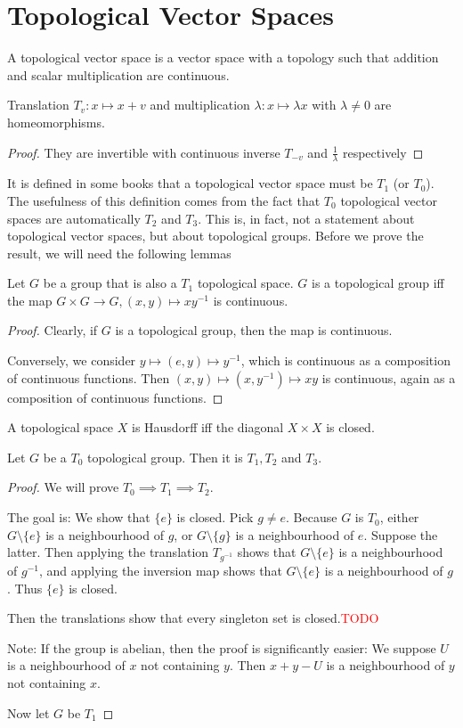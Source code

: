 \documentclass[prb,12pt]{revtex4-2}
\theoremstyle{definition}
\theoremstyle{definition}
\theoremstyle{definition}
\begin{document}
	\section{Topological Vector Spaces}
	\begin{Definition}
		A topological vector space is a vector space with a topology such that addition and scalar multiplication are continuous.
	\end{Definition}
	\begin{Theorem}
		Translation $T_v:x\mapsto x + v$ and multiplication $\lambda: x \mapsto \lambda x$ with $\lambda\neq0$ are homeomorphisms.
	\end{Theorem}
	\begin{proof}
		They are invertible with continuous inverse $T_{-v}$ and $\frac 1\lambda$ respectively
	\end{proof}
	It is defined in some books that a topological vector space must be $T_1$ (or $T_0$). The usefulness of this definition comes from the fact that $T_0$ topological vector spaces are automatically $T_2$ and $T_3$. This is, in fact, not a statement about topological vector spaces, but about topological groups. Before we prove the result, we will need the following lemmas
	\begin{Lemma}
		Let $G$ be a group that is also a $T_1$ topological space. $G$ is a topological group iff the map $G \times G \to G, (x,y)\mapsto xy^{-1}$ is continuous.
	\end{Lemma}
\begin{proof}
	Clearly, if $G$ is a topological group, then the map is continuous. 
	
	Conversely, we consider $y \mapsto (e,y) \mapsto y^{-1}$, which is continuous as a composition of continuous functions. Then $(x,y) \mapsto (x, y^{-1}) \mapsto xy$ is continuous, again as a composition of continuous functions.
\end{proof}
\begin{Lemma}
	A topological space $X$ is Hausdorff iff the diagonal $X\times X$ is closed.
\end{Lemma}
	\begin{Theorem}
		Let $G$ be a $T_0$ topological group. Then it is $T_1, T_2$ and $T_3$.
	\end{Theorem} 
\begin{proof}
	We will prove $T_0\implies T_1\implies T_2$. 
	
	The goal is: We show that $\{e\}$ is closed. Pick $g\neq e$. Because $G$ is $T_0$, either $G \setminus \{e\}$ is a neighbourhood of $g$, or $G \setminus \{g\}$ is a neighbourhood of $e$. Suppose the latter. Then applying the translation $T_{g^{-1}}$ shows that $G \setminus \{e\}$ is a neighbourhood of $g^{-1}$, and applying the inversion map shows that $G \setminus \{e\}$ is a neighbourhood of $g$. Thus $\{e\}$ is closed.
	
	Then the translations show that every singleton set is closed.\textcolor{red}{TODO}
	
	Note: If the group is abelian, then the proof is significantly easier: We suppose $U$ is a neighbourhood of $x$ not containing $y$. Then $x+y-U$ is a neighbourhood of $y$ not containing $x$. 
	
	Now let $G$ be $T_1$
\end{proof}
\end{document}
